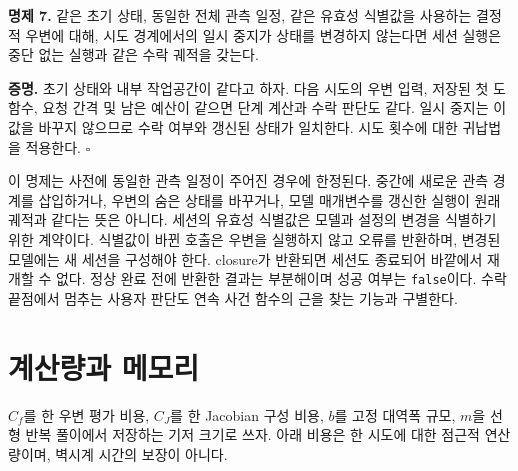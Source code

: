 \documentclass[
  10pt,
  dvipsnames]{article}
\begin{document}
\textbf{명제 7.} 같은 초기 상태, 동일한 전체 관측 일정, 같은 유효성
식별값을 사용하는 결정적 우변에 대해, 시도 경계에서의 일시 중지가 상태를
변경하지 않는다면 세션 실행은 중단 없는 실행과 같은 수락 궤적을 갖는다.

\textbf{증명.} 초기 상태와 내부 작업공간이 같다고 하자. 다음 시도의 우변
입력, 저장된 첫 도함수, 요청 간격 및 남은 예산이 같으면 단계 계산과 수락
판단도 같다. 일시 중지는 이 값을 바꾸지 않으므로 수락 여부와 갱신된
상태가 일치한다. 시도 횟수에 대한 귀납법을 적용한다. \(\square\)

이 명제는 사전에 동일한 관측 일정이 주어진 경우에 한정된다. 중간에
새로운 관측 경계를 삽입하거나, 우변의 숨은 상태를 바꾸거나, 모델
매개변수를 갱신한 실행이 원래 궤적과 같다는 뜻은 아니다. 세션의 유효성
식별값은 모델과 설정의 변경을 식별하기 위한 계약이다. 식별값이 바뀐
호출은 우변을 실행하지 않고 오류를 반환하며, 변경된 모델에는 새 세션을
구성해야 한다. closure가 반환되면 세션도 종료되어 바깥에서 재개할 수
없다. 정상 완료 전에 반환한 결과는 부분해이며 성공 여부는
\texttt{false}이다. 수락 끝점에서 멈추는 사용자 판단도 연속 사건 함수의
근을 찾는 기능과 구별한다.

\hypertarget{uxacc4uxc0b0uxb7c9uxacfc-uxba54uxbaa8uxb9ac}{%
\section{계산량과
메모리}\label{uxacc4uxc0b0uxb7c9uxacfc-uxba54uxbaa8uxb9ac}}

\(C_f\)를 한 우변 평가 비용, \(C_J\)를 한 Jacobian 구성 비용, \(b\)를
고정 대역폭 규모, \(m\)을 선형 반복 풀이에서 저장하는 기저 크기로 쓰자.
아래 비용은 한 시도에 대한 점근적 연산량이며, 벽시계 시간의 보장이
아니다.
\end{document}

